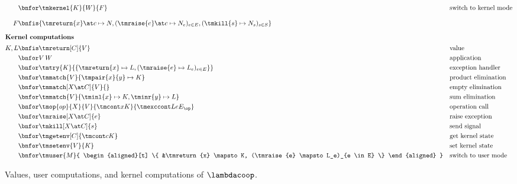 \begin{figure}[tp]
{\begin{align*}
  \bnfor& 
            \tmkernel{K}{W}{F}
                                                  & &\text{switch to kernel mode}
  \\[2ex]
  F \bnfis & \omit \rlap{$\{ \tmreturn{x} \at c \mapsto N, 
                    (\tmraise{e} \at c \mapsto N_e)_{e \in E},
                    (\tmkill{s} \mapsto N_s)_{s \in S} \}$}
  \\[1ex]
  \intertext{\textbf{Kernel computations}}
  K, L
  \bnfis& \tmreturn[C]{V}                         & &\text{value} \\
  \bnfor& V\,W                                    & &\text{application} \\
  \bnfor& \tmtry{K}{
          \{ \tmreturn{x} \mapsto L,
             (\tmraise{e} \mapsto L_e)_{e \in E} \}
          }
                                                  & &\text{exception handler} \\
  \bnfor& \tmmatch{V}{\tmpair{x}{y} \mapsto K}    & &\text{product elimination} \\
  \bnfor& \tmmatch[X \at C]{V}{}                  & &\text{empty elimination} \\
  \bnfor& \tmmatch{V}{\tminl{x} \mapsto K, \tminr{y} \mapsto L}
                                                  & &\text{sum elimination} \\
  \bnfor& \tmop{op}{X}{V}{\tmcont x K}{\tmexccont L e {E_\op}}
                                                  & &\text{operation call} \\
  \bnfor& \tmraise[X \at C]{e}                    & &\text{raise exception} \\
  \bnfor& \tmkill[X \at C]{s}                     & &\text{send signal} \\
  \bnfor& \tmgetenv[C]{\tmcont c K}               & &\text{get kernel state} \\
  \bnfor& \tmsetenv{V}{K}                         & &\text{set kernel state} \\
  \bnfor& \tmuser{M}{
          \begin{aligned}[t]
          \{ &\tmreturn{x} \mapsto K,
             (\tmraise{e} \mapsto L_e)_{e \in E} \}
          \end{aligned}
          }
                                                  & &\text{switch to user mode}
  \end{align*}
  } 
  \caption{Values, user computations, and kernel computations of $\lambdacoop$.}
  \label{fig:lambdacoop-terms}
\end{figure}


